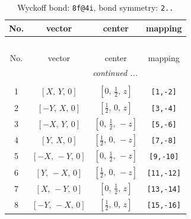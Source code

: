 \documentclass[fleqn,8pt]{jsarticle}
\begin{document}
\begin{longtable}{cccc}
\caption{Wyckoff bond: {\tt 8f@4i}, bond symmetry: {\tt 2..}}
 \\
 \hline \hline
No. & vector & center & mapping \\ \hline \endfirsthead

\multicolumn{3}{l}{\tablename\ \thetable{}} \\
 \hline \hline
No. & vector & center & mapping \\ \hline \endhead

 \hline \hline
\multicolumn{3}{r}{\footnotesize\it continued ...} \\ \endfoot

 \hline \hline
\multicolumn{3}{r}{} \\ \endlastfoot

1 & $\left[ X,\, Y,\, 0 \right]$ & $\left[ 0,\, \frac{1}{2},\, z \right]$ & {\tt [1,-2]} \\ \hline
2 & $\left[ - Y,\, X,\, 0 \right]$ & $\left[ \frac{1}{2},\, 0,\, z \right]$ & {\tt [3,-4]} \\ \hline
3 & $\left[ - X,\, Y,\, 0 \right]$ & $\left[ 0,\, \frac{1}{2},\, - z \right]$ & {\tt [5,-6]} \\ \hline
4 & $\left[ Y,\, X,\, 0 \right]$ & $\left[ \frac{1}{2},\, 0,\, - z \right]$ & {\tt [7,-8]} \\ \hline
5 & $\left[ - X,\, - Y,\, 0 \right]$ & $\left[ 0,\, \frac{1}{2},\, - z \right]$ & {\tt [9,-10]} \\ \hline
6 & $\left[ Y,\, - X,\, 0 \right]$ & $\left[ \frac{1}{2},\, 0,\, - z \right]$ & {\tt [11,-12]} \\ \hline
7 & $\left[ X,\, - Y,\, 0 \right]$ & $\left[ 0,\, \frac{1}{2},\, z \right]$ & {\tt [13,-14]} \\ \hline
8 & $\left[ - Y,\, - X,\, 0 \right]$ & $\left[ \frac{1}{2},\, 0,\, z \right]$ & {\tt [15,-16]} \\
\end{longtable}
\renewcommand{\arraystretch}{1.2}
\end{document}
